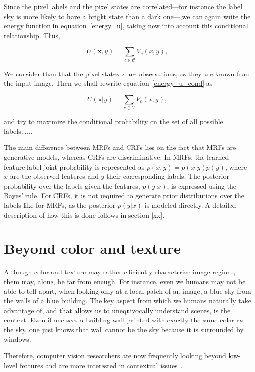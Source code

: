 Since the pixel labels and the pixel states are correlated---for instance the label sky is more likely to have a bright state than a dark one---,we can again write the energy function in equation~\ref{energy_u}, taking now into account this conditional relationship. Thus,

\begin{equation} \label{energy_u_cond} 
U({\mathbf x,y})=\sum_{c \in \mathcal C}V_c(x,y),  
\end{equation}

We consider than that the pixel states x are observations, as they are known from the input image. Then we shall rewrite equation~\ref{energy_u_cond} as

\begin{equation} \label{energy_u_cond} 
U({\mathbf x|y})=\sum_{c \in \mathcal C}V_c(x,y),  
\end{equation}

and try to maximize the conditional probability on the set of all possible labels:..... 








The main difference between MRFs and CRFs lies on the fact that MRFs are generative models, whereas CRFs are discriminative. In MRFs, the learned feature-label joint probability is represented as $p(x,y) = p(x|y)p(y)$, where $x$ are the observed features and $y$ their corresponding labels. The posterior probability over the labels given the features, $p(y|x)$, is expressed using the Bayes' rule. For CRFs, it is not required to generate prior distributions over the labels like for MRFs, as the posterior $p(y|x)$ is modeled directly. A detailed description of how this is done follows in section [xx].

\section{Beyond color and texture} 

Although color and texture may rather efficiently characterize image regions, them may, alone, be far from enough. For instance, even we humans may not be able to tell apart, when looking only at a local patch of an image, a blue sky from the walls of a blue building. The key aspect from which we humans naturally take advantage of, and that allows us to unequivocally understand scenes, is the context. Even if one sees a building wall painted with exactly the same color as the sky, one just knows that wall cannot be the sky because it is surrounded by windows.

Therefore, computer vision researchers are now frequently looking beyond low-level features and are more interested in contextual issues~\cite{feng:color_tex, re:multiscale_CRF, kumar:DRF}.
